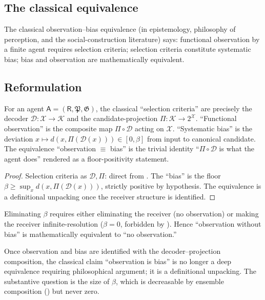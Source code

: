 \documentclass[11pt,twocolumn,a4paper]{article}
\newcommand{\K}{\mathcal{K}}
\newcommand{\D}{\mathcal{D}}
\newcommand{\X}{\mathcal{X}}
\newcommand{\Method}{\mathfrak{P}}
\newcommand{\Goal}{\mathfrak{G}}
\newcommand{\receiver}{\mathsf{R}}
\newcommand{\agent}{\mathsf{A}}
\begin{document}
\subsection{The classical equivalence}

The classical observation--bias equivalence
(in epistemology, philosophy of perception, and the social-construction
literature) says: functional observation by a finite agent requires
selection criteria; selection criteria constitute systematic bias;
bias and observation are mathematically equivalent.

\subsection{Reformulation}

\begin{theorem}\label{thm:bias-decoder}
For an agent $\agent=(\receiver,\Method,\Goal)$, the classical
``selection criteria'' are precisely the decoder $\D:\X\to\K$ and
the candidate-projection $\Pi:\K\to 2^\X$.
``Functional observation'' is the composite map $\Pi\circ\D$ acting
on $\X$. ``Systematic bias'' is the deviation
$x\mapsto d(x,\Pi(\D(x)))\in[0,\beta]$ from input to canonical
candidate. The equivalence
``observation $\equiv$ bias'' is the trivial identity
``$\Pi\circ\D$ is what the agent does'' rendered as a
floor-positivity statement.
\end{theorem}

\begin{proof}
Selection criteria as $\D,\Pi$: direct from . The
``bias'' is the floor $\beta\ge\sup_x d(x,\Pi(\D(x)))$,
strictly positive by hypothesis. The equivalence is a definitional
unpacking once the receiver structure is identified.
\end{proof}

\begin{corollary}
\label{cor:no-elim}
Eliminating $\beta$ requires either eliminating the receiver
(no observation) or making the receiver infinite-resolution
($\beta=0$, forbidden by ). Hence ``observation
without bias'' is mathematically equivalent to ``no observation.''
\end{corollary}

\begin{remark}\label{rem:obs-rhetoric}
Once observation and bias are identified with the decoder--projection
composition, the classical claim ``observation is bias'' is no longer
a deep equivalence requiring philosophical
argument; it is a definitional unpacking. The substantive question
is the size of $\beta$, which is decreasable by ensemble composition
() but never zero.
\end{remark}
\end{document}
